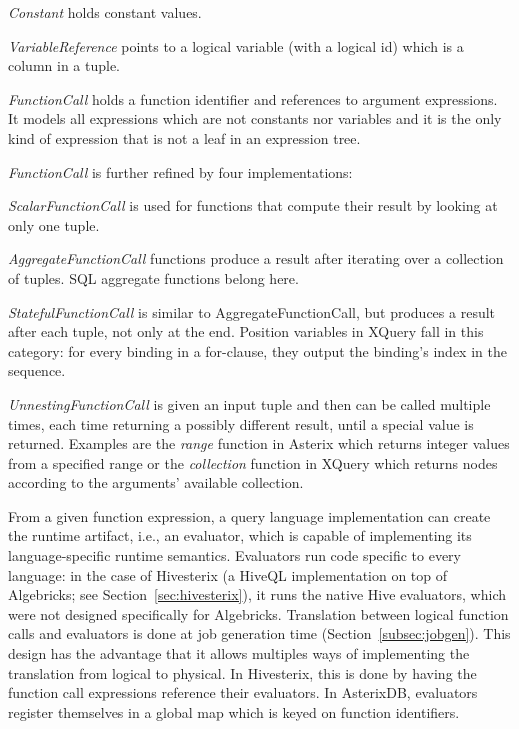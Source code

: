 \begin{list}{}{\leftmargin=1em}\itemsep 0pt \parskip 0pt
\item {\em Constant} holds constant values.
\item {\em VariableReference} points to a logical variable (with a logical id) which is a column in a tuple.
\item {\em FunctionCall} holds a function identifier and references to argument expressions.
  It models all expressions which are not constants nor variables and it is the only kind of expression that is not a leaf in an expression tree.
\end{list}

{\em FunctionCall} is further refined by four implementations:

\begin{list}{}{\leftmargin=1em}\itemsep 0pt \parskip 0pt
\item {\em ScalarFunctionCall} is used for functions that compute their result by looking at only one tuple.

\item {\em AggregateFunctionCall} functions produce a result after iterating over a collection of tuples.
SQL aggregate functions belong here.

\item {\em StatefulFunctionCall} is similar to AggregateFunctionCall, but produces a result after each tuple, not only at the end. 
      Position variables in XQuery fall in this category: for every binding in a for-clause, they output the binding's index in the sequence.

\item {\em UnnestingFunctionCall} is given an input tuple and then can be called multiple times, each time returning a possibly different result, until a special value is returned. 
      Examples are the {\em range} function in Asterix which returns integer values from a specified range or the {\em collection} function in XQuery which returns nodes according to the arguments' available collection.
\end{list}

From a given function expression, a query language implementation can create the runtime artifact, i.e., an evaluator, 
which is capable of implementing its language-specific runtime semantics.
Evaluators run code specific to every language: in the case of Hivesterix (a HiveQL implementation on top of Algebricks; see Section~\ref{sec:hivesterix}), it runs the native Hive evaluators, which were not designed specifically for Algebricks. 
  Translation between logical function calls and evaluators is done at job generation time (Section~\ref{subsec:jobgen}). 
  This design has the advantage that it allows multiples ways of implementing the translation from logical to physical.
  In Hivesterix, this is done by having the function call expressions reference their evaluators.
  In AsterixDB, evaluators register themselves in a global map which is keyed on function identifiers.


